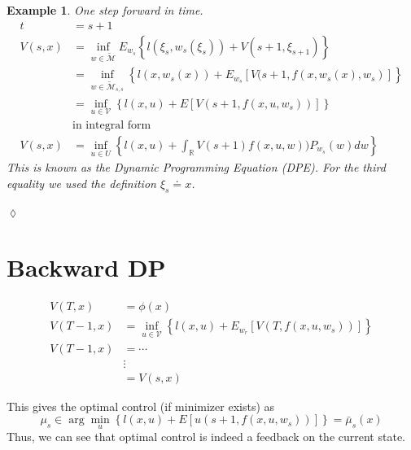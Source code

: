 \documentclass[lecture,12pt,]{pcms-l}
\theoremstyle{example}
\newtheorem{example}{Example}[section]
\begin{document}
\begin{example}
One step forward in time.
\begin{align*}
t &= s+1 \\
V(s,x) &= \inf_{w\in\tilde{\mathcal{M}}} E_{w_s}\left\lbrace l(\xi_s,w_s(\xi_s)) + V(s+1,\xi_{s+1})\right\rbrace \\
&= \inf_{w\in\tilde{\mathcal{M}}_{s,s}} \left\lbrace l(x,w_s(x)) + E_{w_s}[V(s+1,f(x,w_s(x),w_s)]\right\rbrace \\
&= \inf_{u\in\mathcal{V}} \left\lbrace l(x,u) + E[V(s+1,f(x,u,w_s))]\right\rbrace \\
&\text{in integral form} \\
V(s,x) &= \inf_{u\in U} \left\lbrace l(x,u) + \int_{\mathbb{R}}V(s+1)f(x,u,w))P_{w_s}(w)dw\right\rbrace
\end{align*}
This is known as the Dynamic Programming Equation (DPE). For the third equality we used the definition $\xi_s \doteq x$.
\end{example}
$\lozenge$

\section{Backward DP}
\begin{align*}
V(T,x) &= \phi(x) \\
V(T-1,x) &= \inf_{u\in\mathcal{V}} \left\lbrace l(x,u) + E_{w_r}[V(T,f(x,u,w_s))]\right\rbrace \\
V(T-1,x) &= \cdots \\
&\vdots \\
&= V(s,x)
\end{align*}

This gives the optimal control (if minimizer exists) as
$$\mu_s \in \arg\min_{u} \left\lbrace l(x,u) + E[u(s+1,f(x,u,w_s))]\right\rbrace = \bar{\mu}_s(x)$$
Thus, we can see that optimal control is indeed a feedback on the current state.
\end{document}
